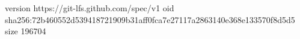 version https://git-lfs.github.com/spec/v1
oid sha256:72b460552d539418721909b31aff0fca7e27117a2863140e368e133570f8d5d5
size 196704
